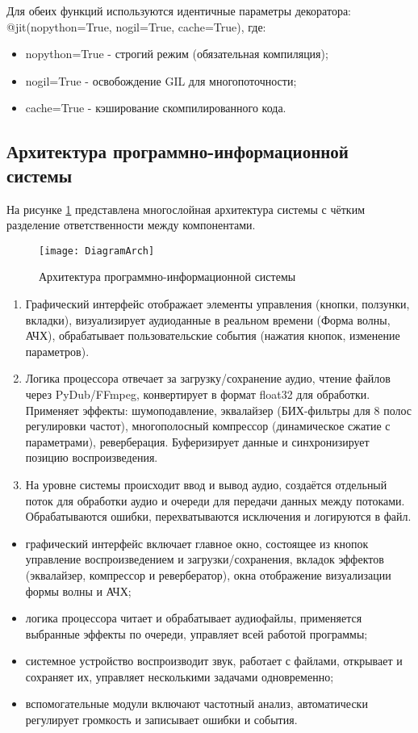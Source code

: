 Для обеих функций используются идентичные параметры декоратора: @jit(nopython=True, nogil=True, cache=True), где:
\begin{itemize}
	\item nopython=True - строгий режим (обязательная компиляция);
	\item nogil=True - освобождение GIL для многопоточности;
	\item cache=True - кэширование скомпилированного кода.
\end{itemize}

\subsection{Архитектура программно-информационной системы}

На рисунке \ref{DiagramArch:image} представлена многослойная архитектура системы с чётким разделение ответственности между компонентами.

\begin{figure}[p]  %
	\centering
	\texttt{[image: DiagramArch]}
	\caption{Архитектура программно-информационной системы}
	\label{DiagramArch:image}
\end{figure}
\clearpage

\begin{enumerate}
	\item Графический интерфейс отображает элементы управления (кнопки, ползунки, вкладки), визуализирует аудиоданные в реальном времени (Форма волны, АЧХ), обрабатывает пользовательские события (нажатия кнопок, изменение параметров).
	\item Логика процессора отвечает за загрузку/сохранение аудио, чтение файлов через PyDub/FFmpeg, конвертирует в формат float32 для обработки. Применяет эффекты: шумоподавление, эквалайзер (БИХ-фильтры для 8 полос регулировки частот), многополосный компрессор (динамическое сжатие с параметрами), реверберация. Буферизирует данные и синхронизирует позицию воспроизведения.
	\item На уровне системы происходит ввод и вывод аудио, создаётся отдельный поток для обработки аудио и очереди для передачи данных между потоками. Обрабатываются ошибки, перехватываются исключения и логируются в файл.
\end{enumerate}

\begin{itemize}
	\item графический интерфейс включает главное окно, состоящее из кнопок управление воспроизведением и загрузки/сохранения, вкладок эффектов (эквалайзер, компрессор и ревербератор), окна отображение визуализации формы волны и АЧХ;
	\item логика процессора читает и обрабатывает аудиофайлы, применяется выбранные эффекты по очереди, управляет всей работой программы;
	\item системное устройство воспроизводит звук, работает с файлами, открывает и сохраняет их, управляет несколькими задачами одновременно;
	\item вспомогательные модули включают частотный анализ, автоматически регулирует громкость и записывает ошибки и события.
\end{itemize}

